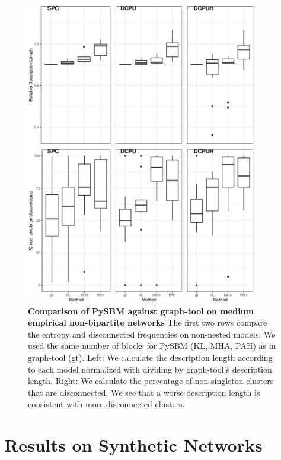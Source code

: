 \documentclass[aps,pre,superscriptaddress]{article}
\begin{document}
\begin{figure}[!htpb]
	\centering
	\includegraphics[width=0.9\textwidth]{figures/pysbm_v_graph_tool_flat.eps}
	\caption[]{
		\textbf{Comparison of PySBM against graph-tool on medium empirical non-bipartite networks}
		The first two rows compare the entropy and disconnected frequencies on non-nested models. %
		We used the same number of blocks for PySBM (KL, MHA, PAH) as in graph-tool (gt). %
		Left: We calculate the description length according to each model normalized with dividing by graph-tool's description length. 
		Right: We calculate the percentage of non-singleton clusters that are disconnected.
		We see that a worse description length is consistent with more disconnected clusters.
	}
	\label{fig:comparison_flat.pdf}
\end{figure}

\clearpage
\section{Results on Synthetic Networks}
\end{document}
